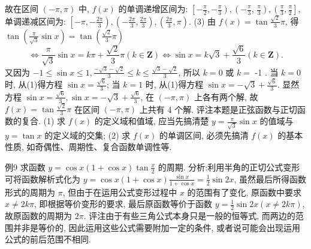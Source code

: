 故在区间 $(-\pi, \pi)$ 中, $f(x)$ 的单调递增区间为: $\left[-\frac{\pi}{2},-\frac{\pi}{3}\right),\left(-\frac{\pi}{3}\right.$, $\left.\frac{\pi}{3}\right),\left(\frac{\pi}{3}, \frac{\pi}{2}\right]$, 单调递减区间为: $\left[-\pi,-\frac{2 \pi}{3}\right),\left(-\frac{2 \pi}{3}, \frac{2 \pi}{3}\right),\left(\frac{2 \pi}{3}, \pi\right)$.
(3) 由 $f(x)=\tan \frac{\sqrt{2}}{3} \pi$, 得 $\tan \left(\frac{\pi}{\sqrt{3}} \sin x\right)=\tan \left(\frac{\sqrt{2}}{3} \pi\right)$
$$
\Leftrightarrow \frac{\pi}{\sqrt{3}} \sin x=k \pi+\frac{\sqrt{2}}{3} \pi(k \in \mathbf{Z}) \Leftrightarrow \sin x=k \sqrt{3}+\frac{\sqrt{6}}{3}(k \in \mathbf{Z}) .
$$
又因为 $-1 \leqslant \sin x \leqslant 1, \frac{-\sqrt{3}-\sqrt{2}}{3} \leqslant k \leqslant \frac{\sqrt{3}-\sqrt{2}}{3}$, 所以 $k=0$ 或 $k=$ -1 .
当 $k=0$ 时, 从(1)得方程 $\sin x=\frac{\sqrt{6}}{3}$;
当 $k=1$ 时, 从(1)得方程 $\sin x=-\sqrt{3}+\frac{\sqrt{6}}{3}$.
显然方程 $\sin x=\frac{\sqrt{6}}{3}, \sin x=-\sqrt{3}+\frac{\sqrt{6}}{3}$, 在 $(-\pi, \pi)$ 上各有两个解, 故 $f(x)=\tan \frac{\sqrt{2}}{3} \pi$ 在区间 $(-\pi, \pi)$ 上共有 4 个解.
评注本题是正弦函数与正切函数的复合.
(1) 求 $f(x)$ 的定义域和值域, 应当先搞清楚 $y=\frac{\pi}{\sqrt{3}} \sin x$ 的值域与 $y=\tan x$ 的定义域的交集; (2) 求 $f(x)$ 的单调区间, 必须先搞清 $f(x)$ 的基本性质, 如奇偶性、周期性、复合函数单调性等.



例9 求函数 $y=\cos x(1+\cos x) \tan \frac{x}{2}$ 的周期.
分析:利用半角的正切公式变形可将函数解析式化为 $y=\cos x(1+ \cos x) \frac{\sin x}{1+\cos x}=\frac{1}{2} \sin 2 x$, 虽然最后所得函数形式的周期为 $\pi$, 但由于在运用公式变形过程中 $x$ 的范围有了变化, 原函数中要求 $x \neq 2 k \pi$, 即根据等价变形的要求, 最后原函数等价于函数 $y=\frac{1}{2} \sin 2 x(x \neq 2 k \pi)$, 故原函数的周期为 $2 \pi$.
评注由于有些三角公式本身只是一般的恒等式, 而两边的范围并非是等价的, 因此运用这些公式需要附加一定的条件, 或者说可能会出现运用公式的前后范围不相同.



